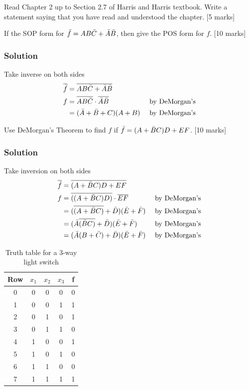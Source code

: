 
\begin{prob}
  Read Chapter 2 up to Section 2.7 of Harris and Harris textbook. Write a statement saying that you have read and understood the chapter. [5 marks]
\end{prob}

\begin{prob}
If the SOP form for $ \bar{f} = AB\bar{C}+\bar{A}\bar{B}$, then give the POS form for
$f$. [10 marks]
\end{prob}
\subsubsection*{Solution}

Take inverse on both sides
\begin{align*}
  \overline{\bar{f}} &= \overline{AB\bar{C}+\bar{A}\bar{B}} &
  \\
  f  &= \overline{AB\bar{C}} \cdot \overline{\bar{A}\bar{B}} & \text{ by DeMorgan's}
  \\
    &= (\bar{A} + \bar{B} + C) (A + B) & \text{ by DeMorgan's}
\end{align*}

\begin{prob}
Use DeMorgan's Theorem to find $f$  if  $\bar{f} = (A + \bar{B} C)D + EF$. [10 marks]
\end{prob}

\subsubsection*{Solution}
Take inversion on both sides
\begin{align*}
  \overline{\bar{f}} &= \overline{(A+\bar{B} C)D + EF} &
  \\
  f  &= \overline{((A+\bar{B} C)D)} \cdot \overline{EF} & \text{ by DeMorgan's}
  \\
  &= (\overline{(A+\bar{B} C)} + \bar{D}) (\bar{E}+\bar{F}) & \text{ by DeMorgan's}
  \\
  &= (\bar{A}\overline{(\bar{B} C)} + \bar{D}) (\bar{E}+\bar{F}) & \text{ by DeMorgan's}
  \\
  &= (\bar{A}(B + \bar{C}) + \bar{D}) (\bar{E}+\bar{F}) & \text{ by DeMorgan's}
\end{align*}

\begin{table}
  \centering
  \begin{tabular}{c|ccc||c}
    \toprule
    Row & $x_1$ & $x_2$ & $x_3$ & f \\
    \midrule
    0 & 0 & 0 & 0 & 0 \\
    1 & 0 & 0 & 1 & 1 \\
    2 & 0 & 1 & 0 & 1 \\
    3 & 0 & 1 & 1 & 0 \\
    4 & 1 & 0 & 0 & 1 \\
    5 & 1 & 0 & 1 & 0 \\
    6 & 1 & 1 & 0 & 0 \\
    7 & 1 & 1 & 1 & 1 \\
    \bottomrule
    \end{tabular}
    \caption{Truth table for a 3-way light switch}
    \label{tab:3-way-light-switch}
\end{table}

